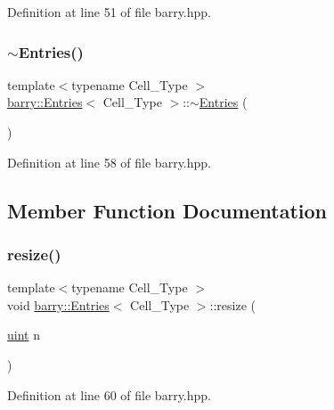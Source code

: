 Definition at line 51 of file barry.\+hpp.

\mbox{\label{classbarry_1_1_entries_a8d74af4d3b545fb79f9f4e8e894160cb}} 
\subsubsection{\texorpdfstring{$\sim$\+Entries()}{~Entries()}}
{\footnotesize\ttfamily template$<$typename Cell\+\_\+\+Type $>$ \\
\hyperlink{classbarry_1_1_entries}{barry\+::\+Entries}$<$ Cell\+\_\+\+Type $>$\+::$\sim$\hyperlink{classbarry_1_1_entries}{Entries} (\begin{DoxyParamCaption}{ }\end{DoxyParamCaption})\hspace{0.3cm}{\ttfamily [inline]}}



Definition at line 58 of file barry.\+hpp.



\subsection{Member Function Documentation}
\mbox{\label{classbarry_1_1_entries_a0c1e6fb0a6e2c462ba782433ac11e026}} 
\subsubsection{\texorpdfstring{resize()}{resize()}}
{\footnotesize\ttfamily template$<$typename Cell\+\_\+\+Type $>$ \\
void \hyperlink{classbarry_1_1_entries}{barry\+::\+Entries}$<$ Cell\+\_\+\+Type $>$\+::resize (\begin{DoxyParamCaption}\item[{\hyperlink{namespacebarry_a11dfc53ddb4672278319aa04f1e09a6c}{uint}}]{n }\end{DoxyParamCaption})\hspace{0.3cm}{\ttfamily [inline]}}



Definition at line 60 of file barry.\+hpp.



